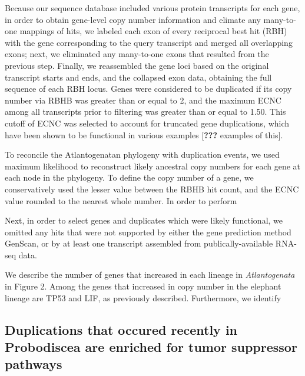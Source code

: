 \documentclass[10pt,letterpaper]{article}
\begin{document}
Because our sequence database included various protein transcripts for
each gene, in order to obtain gene-level copy number information and
elimate any many-to-one mappings of hits, we labeled each exon of every
reciprocal best hit (RBH) with the gene corresponding to the query
transcript and merged all overlapping exons; next, we eliminated any
many-to-one exons that resulted from the previous step. Finally, we
reassembled the gene loci based on the original transcript starts and
ends, and the collapsed exon data, obtaining the full sequence of each
RBH locus. Genes were considered to be duplicated if its copy number via
RBHB was greater than or equal to 2, and the maximum ECNC among all
transcripts prior to filtering was greater than or equal to 1.50. This
cutoff of ECNC was selected to account for truncated gene duplications,
which have been shown to be functional in various examples
{[}{\textbf{???}} examples of this{]}.

To reconcile the Atlantogenatan phylogeny with duplication events, we
used maximum likelihood to reconstruct likely ancestral copy numbers for
each gene at each node in the phylogeny. To define the copy number of a
gene, we conservatively used the lesser value between the RBHB hit
count, and the ECNC value rounded to the nearest whole number. In order
to perform

Next, in order to select genes and duplicates which were likely
functional, we omitted any hits that were not supported by either the
gene prediction method GenScan, or by at least one transcript assembled
from publically-available RNA-seq data.

We describe the number of genes that increased in each lineage in
\emph{Atlantogenata} in Figure 2. Among the genes that increased in copy
number in the elephant lineage are TP53 and LIF, as previously
described. Furthermore, we identify

\hypertarget{duplications-that-occured-recently-in-probodiscea-are-enriched-for-tumor-suppressor-pathways}{%
\subsection{Duplications that occured recently in Probodiscea are
enriched for tumor suppressor
pathways}\label{duplications-that-occured-recently-in-probodiscea-are-enriched-for-tumor-suppressor-pathways}}
\end{document}

